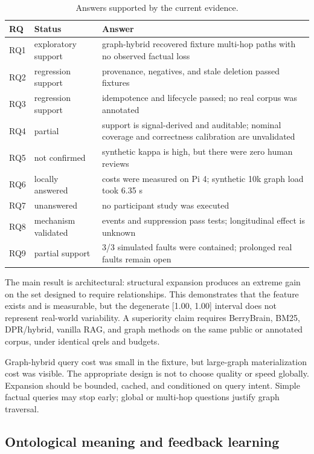 \documentclass{sbc2023}
\begin{document}
\begin{table}[!htbp]
\caption{Answers supported by the current evidence.}
\label{tab:rqs}
\centering
\scriptsize
\begin{tabularx}{\columnwidth}{p{0.50cm}p{1.30cm}Y}
\toprule
RQ & Status & Answer \\
\midrule
RQ1 & exploratory support & graph-hybrid recovered fixture multi-hop paths with no observed factual loss \\
RQ2 & regression support & provenance, negatives, and stale deletion passed fixtures \\
RQ3 & regression support & idempotence and lifecycle passed; no real corpus was annotated \\
RQ4 & partial & support is signal-derived and auditable; nominal coverage and correctness calibration are unvalidated \\
RQ5 & not confirmed & synthetic kappa is high, but there were zero human reviews \\
RQ6 & locally answered & costs were measured on Pi 4; synthetic 10k graph load took 6.35 s \\
RQ7 & unanswered & no participant study was executed \\
RQ8 & mechanism validated & events and suppression pass tests; longitudinal effect is unknown \\
RQ9 & partial support & 3/3 simulated faults were contained; prolonged real faults remain open \\
\bottomrule
\end{tabularx}
\end{table}

The main result is architectural: structural expansion produces an extreme gain on the set
designed to require relationships. This demonstrates that the feature exists and is measurable,
but the degenerate [1.00, 1.00] interval does not represent real-world variability. A superiority
claim requires BerryBrain, BM25, DPR/hybrid, vanilla RAG, and graph methods on the same public or
annotated corpus, under identical qrels and budgets.

Graph-hybrid query cost was small in the fixture, but large-graph materialization cost was visible.
The appropriate design is not to choose quality or speed globally. Expansion should be bounded,
cached, and conditioned on query intent. Simple factual queries may stop early; global or
multi-hop questions justify graph traversal.

\subsection{Ontological meaning and feedback learning}
\end{document}
